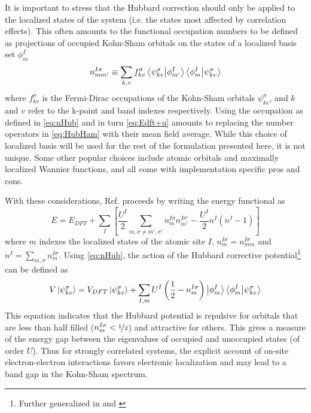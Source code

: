 \documentclass[12pt]{article}
\newcommand{\lrp}[1]{\left( #1 \right)}
\newcommand{\lrb}[1]{\left[ #1 \right]}
\begin{document}
It is important to stress that the Hubbard correction should only be applied to the localized states of the system (i.e. the states most affected by correlation effects). This often amounts to the functional occupation numbers to be defined as projections of occupied Kohn-Sham orbitals on the states of a localized basis set $\phi^I_{m}$
\begin{equation}\label{eq:nHub}
    n^{I\sigma}_{mm'} \equiv \sum_{k,v}f^\sigma_{kv}\bra{\psi^\sigma_{kv}}\ket{\phi^I_{m'}}\bra{\phi^I_{m}}\ket{\psi^\sigma_{kv}}
\end{equation}
where $f^\sigma_{kv}$ is the Fermi-Dirac occupations of the Kohn-Sham orbitals $\psi^\sigma_{kv}$, and $k$ and $v$ refer to the k-point and band indexes respectively. Using the occupation as defined in \eqref{eq:nHub} and in turn \eqref{eq:Edft+u} amounts to replacing the number operators in \eqref{eq:HubHam} with their mean field average. While this choice of localized basis will be used for the rest of the formulation presented here, it is not unique. Some other popular choices include atomic orbitals and maximally localized Wannier functions, and all come with implementation specific pros and cons. 

With these considerations, Ref. \cite{OGDFT+U} proceeds by writing the energy functional as 
\begin{equation}
    E = E_{DFT} + \sum_I \lrb{\frac{U^I}{2}\sum_{m,\sigma\neq m',\sigma'}n_{m}^{I\sigma}n^{I\sigma'}_{m'}-\frac{U^I}{2}n^I(n^I-1)}
\end{equation}
where $m$ indexes the localized states of the atomic site $I$, $n_{m}^{I\sigma} = n_{mm}^{I\sigma}$ and $n^I = \sum_{m,\sigma}n_{m}^{I\sigma}$. Using \eqref{eq:nHub}, the action of the Hubbard corrective potential\footnote{Further generalized in \cite{DFT+Uformulation} and \cite{Duradev}} can be defined as 
\begin{equation}
    V\ket{\psi^\sigma_{kv}} = V_{DFT}\ket{\psi^\sigma_{kv}} + \sum_{I,m}U^I\lrp{\frac{1}{2}-n^{I\sigma}_m}\ket{\phi^I_{m}}\bra{\phi^I_{m}}\ket{\psi^\sigma_{kv}}
\end{equation}
This equation indicates that the Hubbard potential is repulsive for orbitals that are less than half filled ($n_m^{I\sigma}<\nicefrac{1}{2}$) and attractive for others. This gives a measure of the energy gap between the eigenvalues of occupied and unoccupied states (of order $U$). Thus for strongly correlated systems, the explicit account of on-site electron-electron interactions favors electronic localization and may lead to a band gap in the Kohn-Sham spectrum.

\printbibliography[
title={Bibliography}
]
\end{document}
